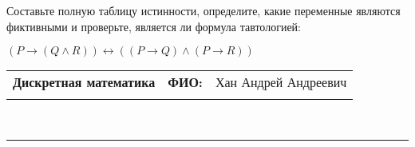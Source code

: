 \documentclass[10pt]{exam}
\newcommand{\class}{Дискретная математика}
\newcommand{\examdate}{}
\begin{document}
\begin{questions}
\begin{enumerate} [a)]
\end{enumerate}\question Составьте полную таблицу истинности, определите, какие переменные являются фиктивными и проверьте, является ли формула тавтологией:

$(P \rightarrow (Q \land R)) \leftrightarrow ((P \rightarrow Q) \land (P \rightarrow R))$

\end{questions}
\newpage
\begin{flushright}
\begin{tabular}{p{2.8in} r l}
\textbf{\class} & \textbf{ФИО:} &Хан Андрей Андреевич
\\

\textbf{\examdate} &&\\
\end{tabular}\\
\end{flushright}
\rule[1ex]{\textwidth}{.1pt}
\end{document}

